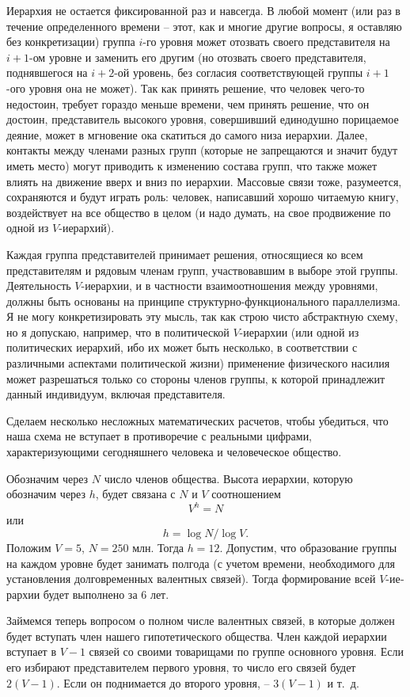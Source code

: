 \documentclass{book}
\begin{document}
Иерархия не остается фиксированной раз и навсегда. В любой момент (или раз в течение определенного времени -- этот, как и многие другие вопросы, я оставляю без конкретизации) группа $i$-го уровня может отозвать своего представителя на $i+1$-ом уровне и заменить его другим (но отозвать своего представителя, поднявшегося на $i+2$-ой уровень, без согласия соответствующей группы $i+1$-ого уровня она не может). Так как принять решение, что человек чего-то недостоин, требует гораздо меньше времени, чем принять решение, что он достоин, представитель высокого уровня, совершивший единодушно порицаемое деяние, может в мгновение ока скатиться до само­го низа иерархии. Далее, контакты между членами разных групп (которые не запрещаются и значит будут иметь место) могут приводить к изменению состава групп, что также может влиять на движение вверх и вниз по иерархии. Массовые связи тоже, разумеется, сохраняются и будут играть роль: человек, написавший хорошо читаемую книгу, воздействует на все об­щество в целом (и надо 
думать, на свое продвижение по одной из $V$-иерархий).

Каждая группа представителей принимает решения, относя­щиеся ко всем представителям и рядовым членам групп, участ­вовавшим в выборе этой группы. Деятельность $V$-иерархии, и в частности взаимоотношения между уровнями, должны быть основаны на принципе структурно-функционального паралле­лизма. Я не могу конкретизировать эту мысль, так как строю чисто абстрактную схему, но я допускаю, например, что в политической $V$-иерархии (или одной из политических иерархий, ибо их может быть несколько, в соответствии с различными ас­пектами политической жизни) применение физического наси­лия может разрешаться только со стороны членов группы, к которой принадлежит данный индивидуум, включая представи­теля.

Сделаем несколько несложных математических расчетов, чтобы убедиться, что наша схема не вступает в противоречие с реальными цифрами, характеризующими сегодняшнего чело­века и человеческое общество.

Обозначим через $N$  число членов общества. Высота иерархии, которую обозначим через $h$,  будет связана с $N$ и $V$  соотноше­нием
\[
	V^h=N
\]
или 
\[
	h = \log N / \log V. 
\]
Положим $V=5$, $N=250$ млн. Тогда $h=12$.  Допустим, что образование группы на каждом уровне будет занимать полго­да (с учетом времени, необходимого для установления долго­временных валентных связей). Тогда формирование всей $V$-ие­рархии будет выполнено за 6 лет.

Займемся теперь вопросом о полном числе валентных связей, в которые должен будет вступать член нашего гипотетического общества. Член каждой иерархии вступает в $V-1$  связей со свои­ми товарищами по группе основного уровня. Если его избирают представителем первого уровня, то число его связей будет $2(V-1)$.  Если он поднимается до второго уровня, -- $3(V-1)$  и т.~д.
\end{document}

